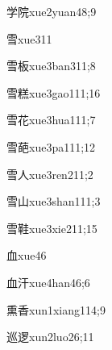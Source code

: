 \begin{verbete}{学院}{xue2yuan4}{8;9}
\end{verbete}

\begin{verbete}{雪}{xue3}{11}
\end{verbete}

\begin{verbete}{雪板}{xue3ban3}{11;8}
\end{verbete}

\begin{verbete}{雪糕}{xue3gao1}{11;16}
\end{verbete}

\begin{verbete}{雪花}{xue3hua1}{11;7}
\end{verbete}

\begin{verbete}{雪葩}{xue3pa1}{11;12}
\end{verbete}

\begin{verbete}{雪人}{xue3ren2}{11;2}
\end{verbete}

\begin{verbete}{雪山}{xue3shan1}{11;3}
\end{verbete}

\begin{verbete}{雪鞋}{xue3xie2}{11;15}
\end{verbete}

\begin{verbete}{血}{xue4}{6}
\end{verbete}

\begin{verbete}{血汗}{xue4han4}{6;6}
\end{verbete}

\begin{verbete}{熏香}{xun1xiang1}{14;9}
\end{verbete}

\begin{verbete}{巡逻}{xun2luo2}{6;11}
\end{verbete}

